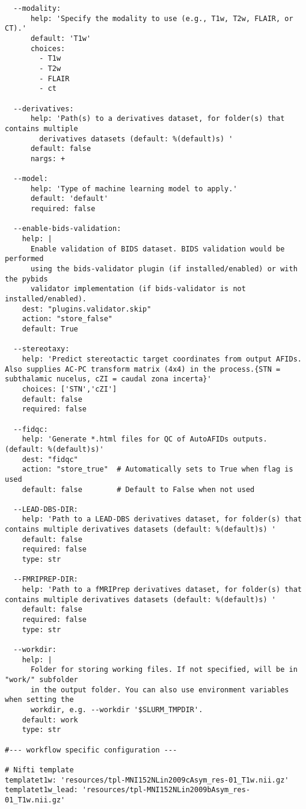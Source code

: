 \begin{verbatim}
  --modality: 
      help: 'Specify the modality to use (e.g., T1w, T2w, FLAIR, or CT).'
      default: 'T1w'
      choices:
        - T1w
        - T2w
        - FLAIR
        - ct

  --derivatives:
      help: 'Path(s) to a derivatives dataset, for folder(s) that contains multiple
        derivatives datasets (default: %(default)s) '
      default: false
      nargs: +

  --model:
      help: 'Type of machine learning model to apply.'
      default: 'default'
      required: false

  --enable-bids-validation:
    help: |
      Enable validation of BIDS dataset. BIDS validation would be performed
      using the bids-validator plugin (if installed/enabled) or with the pybids
      validator implementation (if bids-validator is not installed/enabled).
    dest: "plugins.validator.skip"
    action: "store_false"
    default: True

  --stereotaxy:
    help: 'Predict stereotactic target coordinates from output AFIDs. Also supplies AC-PC transform matrix (4x4) in the process.{STN = subthalamic nucelus, cZI = caudal zona incerta}'
    choices: ['STN','cZI']
    default: false
    required: false

  --fidqc:
    help: 'Generate *.html files for QC of AutoAFIDs outputs. (default: %(default)s)'
    dest: "fidqc"
    action: "store_true"  # Automatically sets to True when flag is used
    default: false        # Default to False when not used

  --LEAD-DBS-DIR:
    help: 'Path to a LEAD-DBS derivatives dataset, for folder(s) that contains multiple derivatives datasets (default: %(default)s) '
    default: false
    required: false
    type: str

  --FMRIPREP-DIR:
    help: 'Path to a fMRIPrep derivatives dataset, for folder(s) that contains multiple derivatives datasets (default: %(default)s) '
    default: false
    required: false
    type: str

  --workdir:
    help: |
      Folder for storing working files. If not specified, will be in "work/" subfolder 
      in the output folder. You can also use environment variables when setting the 
      workdir, e.g. --workdir '$SLURM_TMPDIR'.
    default: work
    type: str

#--- workflow specific configuration ---

# Nifti template
templatet1w: 'resources/tpl-MNI152NLin2009cAsym_res-01_T1w.nii.gz'
templatet1w_lead: 'resources/tpl-MNI152NLin2009bAsym_res-01_T1w.nii.gz'


\end{verbatim}
